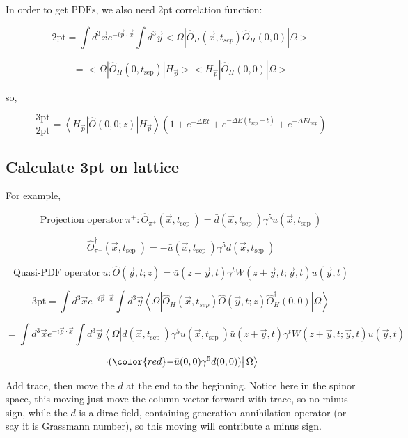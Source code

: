 \documentclass[11pt]{article} %
\begin{document}
In order to get $\text{PDFs}$, we also need 2pt correlation function:

\[ \text{2pt} = \int d^{3} \vec{x} e^{-i \vec{p} \cdot \vec{x}} \int d^{3} \vec{y}<\Omega |\hat{O}_{H}\left(\vec{x}, t_{s e p}\right) \hat{O}_{H}^{\dagger}(0,0) | \Omega> \]

\[ = <\Omega |\hat{O}_{H} (0, t_{\text{sep}})  |H_{\vec{p}}>  <H_{\vec{p}}| \hat{O}_{H}^{\dagger}(0, 0) | \Omega> \]

so,

\[ \frac{\text{3pt}}{\text{2pt}} = \left\langle H_{\vec{p}}|\hat{O}(0,0 ; z)| H_{\vec{p}}\right\rangle\left(1+e^{-\Delta E t}+e^{-\Delta E(t_{\text{sep}}-t)}+e^{-\Delta E t_{s e p}}\right) \]


\subsection{Calculate 3pt on lattice}

For example,

\[ \text{Projection operator}\ \pi^+: \hat{O}_{\pi^+}\left(\vec{x}, t_{\text {sep }}\right)=\bar{d}\left(\vec{x}, t_{\text {sep }}\right) \gamma^{5} u\left(\vec{x}, t_{\text {sep }}\right) \]

\[ \hat{O}^{\dagger}_{\pi^+}\left(\vec{x}, t_{\text {sep }}\right)=- \bar{u}\left(\vec{x}, t_{\text {sep }}\right) \gamma^{5} d\left(\vec{x}, t_{\text {sep }}\right) \]

\[ \text{Quasi-PDF operator}\ u: \hat{O}(\vec{y}, t ; z)=\bar{u}(z+\vec{y}, t) \gamma^{t} W(z+\vec{y}, t ; \vec{y}, t) u(\vec{y}, t) \]


\[ \text{3pt} = \int d^{3} \vec{x} e^{-i \vec{p} \cdot \vec{x}} \int d^3 \vec{y}\left\langle\Omega\left|\hat{O}_{H}\left(\vec{x}, t_{s e p}\right) \hat{O}(\vec{y}, t ; z) \hat{O}_{H}^{\dagger}(0,0)\right| \Omega\right\rangle \]

\[ = \int d^{3} \vec{x} e^{-i \vec{p} \cdot \vec{x}} \int d^3 \vec{y}\left\langle\Omega\left|\bar{d}\left(\vec{x}, t_{\text {sep }}\right) \gamma^{5} u\left(\vec{x}, t_{\text {sep }}\right) \bar{u}(z+\vec{y}, t) \gamma^{t} W(z+\vec{y}, t ; \vec{y}, t) u(\vec{y}, t) \right.\right.\]

\[\left. \left. \cdot ( {\color{red}-} \bar{u}(0, 0) \gamma^{5} d(0, 0) )  \right| \Omega\right\rangle \]

Add trace, then move the $d$ at the end to the beginning. {\color{red} Notice here in the spinor space, this moving just move the column vector forward with trace, so no minus sign, while the $d$ is a dirac field, containing generation annihilation operator (or say it is Grassmann number), so this moving will contribute a minus sign. }
\end{document}
